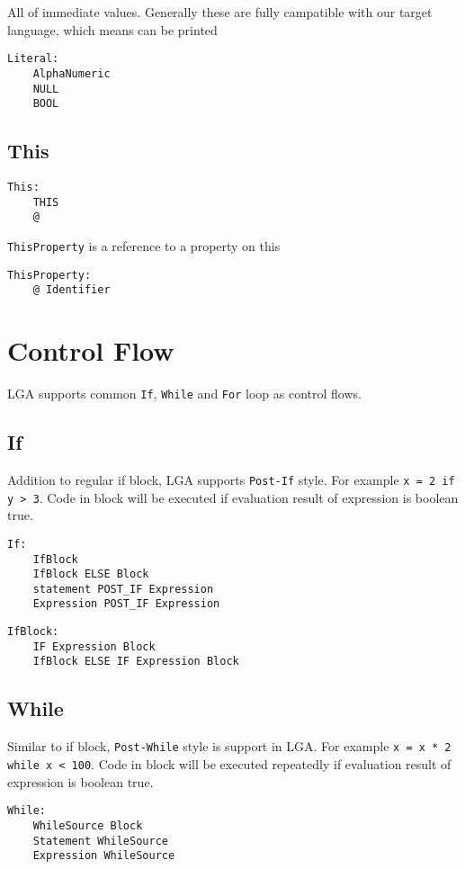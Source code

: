 \documentclass[10pt]{report}
\begin{document}
All of immediate values. Generally these are fully campatible with our target language, which means can be printed
\begin{verbatim}
Literal:
    AlphaNumeric
    NULL
    BOOL
\end{verbatim}

\subsection{This}

\begin{verbatim}
This:
    THIS
    @
\end{verbatim}

\texttt{ThisProperty} is a reference to a property on this
\begin{verbatim}
ThisProperty:
    @ Identifier
\end{verbatim}

\section{Control Flow}

LGA supports common \texttt{If}, \texttt{While} and \texttt{For} loop as control flows.


\subsection{If}
Addition to regular if block, LGA supports \texttt{Post-If} style. For example \texttt{x = 2 if y > 3}. Code in block will be executed if evaluation result of expression is boolean true.
\begin{verbatim}
If:
    IfBlock
    IfBlock ELSE Block
    statement POST_IF Expression
    Expression POST_IF Expression
\end{verbatim}

\begin{verbatim}
IfBlock:
    IF Expression Block
    IfBlock ELSE IF Expression Block
\end{verbatim}

\subsection{While}
Similar to if block, \texttt{Post-While} style is support in LGA. For example \texttt{x = x * 2 while x < 100}. Code in block will be executed repeatedly if evaluation result of expression is boolean true.
\begin{verbatim}
While:
    WhileSource Block
    Statement WhileSource
    Expression WhileSource
\end{verbatim}
\end{document}
